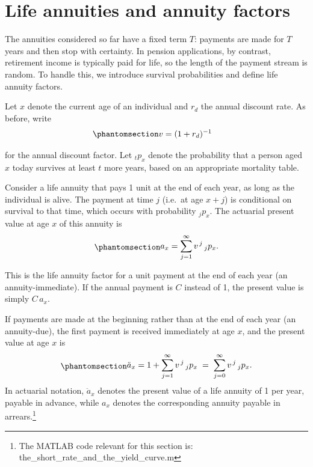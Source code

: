 \documentclass[
  letterpaper,
  DIV=11,
  numbers=noendperiod]{scrreprt}
\begin{document}
\section*{Life annuities and annuity
factors}\label{life-annuities-and-annuity-factors}


The annuities considered so far have a fixed term \(T\): payments are
made for \(T\) years and then stop with certainty. In pension
applications, by contrast, retirement income is typically paid for life,
so the length of the payment stream is random. To handle this, we
introduce survival probabilities and define life annuity factors.

Let \(x\) denote the current age of an individual and \(r_d\) the annual
discount rate. As before, write
\begin{equation}\protect\phantomsection\label{eq-gen-0011}{
\begin{align}
    v &= (1 + r_d)^{-1}
\end{align}
}\end{equation}

for the annual discount factor. Let \({}_t p_x\) denote the probability
that a person aged \(x\) today survives at least \(t\) more years, based
on an appropriate mortality table.

Consider a life annuity that pays 1 unit at the end of each year, as
long as the individual is alive. The payment at time \(j\) (i.e.~at age
\(x+j\)) is conditional on survival to that time, which occurs with
probability \({}_j p_x\). The actuarial present value at age \(x\) of
this annuity is
\begin{equation}\protect\phantomsection\label{eq-gen-0012}{  
\begin{align}
    a_x = \sum_{j=1}^{\infty} v^{\,j} \, {}_j p_x.
\end{align}
}\end{equation}

This is the life annuity factor for a unit payment at the end of each
year (an annuity-immediate). If the annual payment is \(C\) instead of
1, the present value is simply \(C \, a_x\).

If payments are made at the beginning rather than at the end of each
year (an annuity-due), the first payment is received immediately at age
\(x\), and the present value at age \(x\) is
\begin{equation}\protect\phantomsection\label{eq-gen-0013}{  
\begin{align}
    \ddot{a}_x = 1 + \sum_{j=1}^{\infty} v^{\,j} \, {}_j p_x
     \;=\; \sum_{j=0}^{\infty} v^{\,j} \, {}_j p_x.
\end{align}
}\end{equation} In actuarial notation, \(\ddot{a}_x\) denotes the
present value of a life annuity of 1 per year, payable in advance, while
\(a_x\) denotes the corresponding annuity payable in arrears.\footnote{The
  MATLAB code relevant for this section is:
  the\_short\_rate\_and\_the\_yield\_curve.m}
\end{document}
